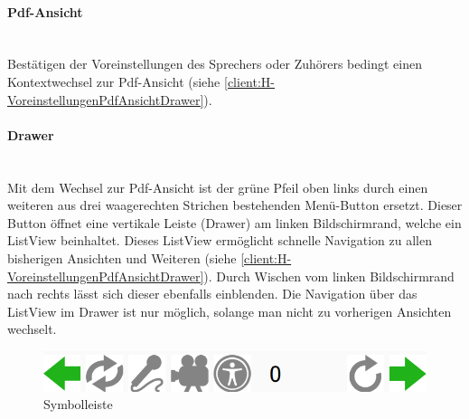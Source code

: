 \paragraph{Pdf-Ansicht}$\;$\\
Bestätigen der Voreinstellungen des Sprechers oder Zuhörers bedingt einen Kontextwechsel zur Pdf-Ansicht (siehe \autoref{client:H-VoreinstellungenPdfAnsichtDrawer}).
\paragraph{Drawer}$\;$\\
Mit dem Wechsel zur Pdf-Ansicht ist der grüne Pfeil oben links durch einen weiteren aus drei waagerechten Strichen bestehenden Menü-Button ersetzt. Dieser Button öffnet eine vertikale Leiste (Drawer) am linken Bildschirmrand, welche ein ListView beinhaltet. Dieses ListView ermöglicht schnelle Navigation zu allen bisherigen Ansichten und Weiteren (siehe \autoref{client:H-VoreinstellungenPdfAnsichtDrawer}). Durch Wischen vom linken Bildschirmrand nach rechts lässt sich dieser ebenfalls einblenden. Die Navigation über das ListView im Drawer ist nur möglich, solange man nicht zu vorherigen Ansichten wechselt.

\begin{figure}[ht!]
	\centering
	\includegraphics[scale=0.5]{GUI/Bilder/SchnellLeiste.PNG}
	\caption{Symbolleiste{\tiny}}
	\label{client:Symbolleiste}
\end{figure}

